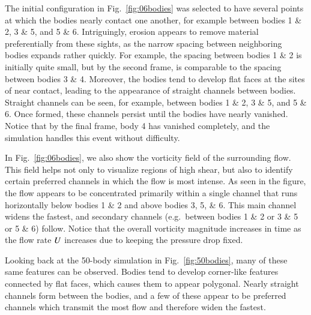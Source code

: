 \documentclass[preprint, 10pt]{elsarticle}
\begin{document}
The initial configuration in  Fig.~\ref{fig:06bodies} was selected to have several points at which the bodies nearly contact one another, for example between bodies 1 \& 2, 3 \& 5, and 5 \& 6. Intriguingly, erosion appears to remove material preferentially from these sights, as the narrow spacing between neighboring bodies expands rather quickly. For example, the spacing between bodies 1 \& 2 is initially quite small, but by the second frame, is comparable to the spacing between bodies 3 \& 4. Moreover, the bodies tend to develop flat faces at the sites of near contact, leading to the appearance of straight channels between bodies. Straight channels can be seen, for example, between bodies 1 \& 2, 3 \& 5, and 5 \& 6. Once formed, these channels persist until the bodies have nearly vanished. Notice that by the final frame, body 4 has vanished completely, and the simulation handles this event without difficulty.

In Fig.~\ref{fig:06bodies}, we also show the vorticity field of the surrounding flow. This field helps not only to visualize regions of high shear, but also to identify certain preferred channels in which the flow is most intense.  As seen in the figure, the flow appears to be concentrated primarily within a single channel that runs horizontally below bodies 1 \& 2 and above bodies 3, 5, \& 6. This main channel widens the fastest, and secondary channels (e.g.~between bodies 1 \& 2 or 3 \& 5 or 5 \& 6) follow. Notice that the overall vorticity magnitude increases in time as the flow rate $U$ increases due to keeping the pressure drop fixed.

Looking back at the 50-body simulation in Fig.~\ref{fig:50bodies}, many of these same features can be observed. Bodies tend to develop corner-like features connected by flat faces, which causes them to appear polygonal. Nearly straight channels form between the bodies, and a few of these appear to be preferred channels which transmit the most flow and therefore widen the fastest.
\end{document}
